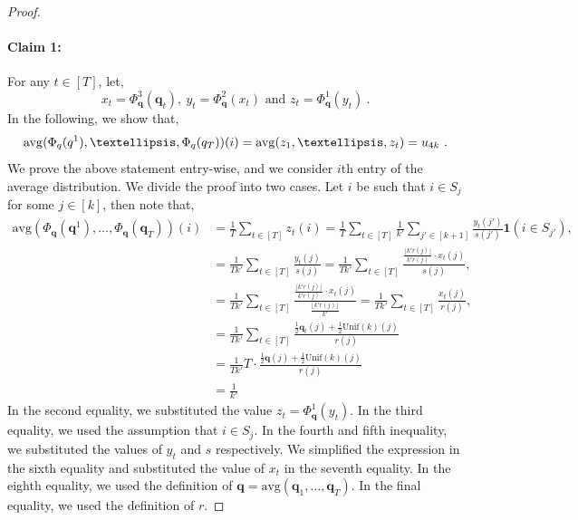\documentclass[10pt]{article} %
\theoremstyle{plain}
\newcommand{\unik}{\mathrm{Unif}(k)}%
\newcommand{\bq}{\textbf{q}}
\newcommand{\avg}{\mathrm{avg}}
\begin{document}
\begin{proof}
	\paragraph{Claim 1:}
	For any $t \in [T]$, let,
	$$x_t=\Phi_{\bq}^3(\bq_t),~ y_t=\Phi_{\bq}^2(x_t) \text{ and }z_t=\Phi_{\bq}^1(y_t)~.$$
	In the following, we show that,
	$$\avg(\Phi_{\bq}(\bq^1),\dots,\Phi_{\bq}(\bq_T))(i)=\avg(z_1,\dots ,z_t)=\uni_{4k}~.$$
	We prove the above statement entry-wise, and we consider $i$th entry of the average distribution. We divide the proof into two cases. Let $i$ be such that $i\in S_{j}$ for some $j \in [k]$, then note that,
	\begingroup
	\allowdisplaybreaks
	\begin{align*}
		\avg(\Phi_{\bq}(\bq^1),\dots,\Phi_{\bq}(\bq_T))(i)
		&=\frac{1}{T}\sum_{t \in [T]}z_t(i)
		=\frac{1}{T}\sum_{t \in [T]}\frac{1}{k'}\sum_{j' \in [k+1]}\frac{y_t(j')}{s(j')}\textbf{1}(i \in S_{j'}),\\
		&=\frac{1}{Tk'} \sum_{t \in [T]}\frac{y_t(j)}{s(j)}
		=\frac{1}{Tk'} \sum_{t \in [T]}\frac{\frac{\lfloor k'r(j)\rfloor}{k'r(j)} \cdot x_t(j)}{s(j)},\\
		&=\frac{1}{Tk'} \sum_{t \in [T]}\frac{\frac{\lfloor k'r(j)\rfloor}{k'r(j)} \cdot x_t(j)}{\frac{\lfloor k'r(j)\rfloor}{k'}}
		=\frac{1}{Tk'} \sum_{t \in [T]}\frac{x_t(j)}{r(j)},\\
		&=\frac{1}{Tk'} \sum_{t \in [T]}\frac{\frac{1}{2}\bq_{t}(j)+\frac{1}{2}\unik(j)}{r(j)} \\
		&=\frac{1}{Tk'} T \cdot \frac{\frac{1}{2}\bq(j)+\frac{1}{2}\unik(j)}{r(j)}\\
		&=\frac{1}{k'}
	\end{align*}
	\endgroup
	In the second equality, we substituted the value $z_t=\Phi_{\bq}^1(y_t)$. In the third equality, we used the assumption that $i \in S_{j}$. In the fourth and fifth inequality, we substituted the values of $y_t$ and $s$ respectively. We simplified the expression in the sixth equality and substituted the value of $x_t$ in the seventh equality. In the eighth equality, we used the definition of $\bq=\avg(\bq_1, \dots, \bq_T)$. In the final equality, we used the definition of $r$.
	

\end{proof}
\end{document}
